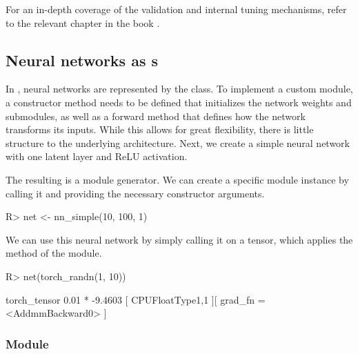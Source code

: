 \documentclass[article]{jss}
\theoremstyle{definition}
\begin{document}
For an in-depth coverage of the validation and internal tuning mechanisms, refer to the relevant  chapter in the  book \citep{ref-mlr3book-valid}.

\subsection[Neural networks as Graphs]{Neural networks as s}

In , neural networks are represented by the  class.
To implement a custom module, a constructor method needs to be defined that initializes the network weights and submodules, as well as a forward method that defines how the network transforms its inputs.
While this allows for great flexibility, there is little structure to the underlying architecture.
Next, we create a simple neural network with one latent layer and ReLU activation.

\newpage


The resulting  is a module generator.
We can create a specific module instance by calling it and providing the necessary constructor arguments.

\begin{CodeInput}
R> net <- nn_simple(10, 100, 1)
\end{CodeInput}

We can use this neural network by simply calling it on a tensor, which applies the  method of the module.

\begin{CodeInput}
R> net(torch_randn(1, 10))
\end{CodeInput}

\begin{CodeOutput}
torch_tensor
0.01 *
-9.4603
[ CPUFloatType{1,1} ][ grad_fn = <AddmmBackward0> ]
\end{CodeOutput}

\subsubsection[Module Graph]{Module }
\end{document}

